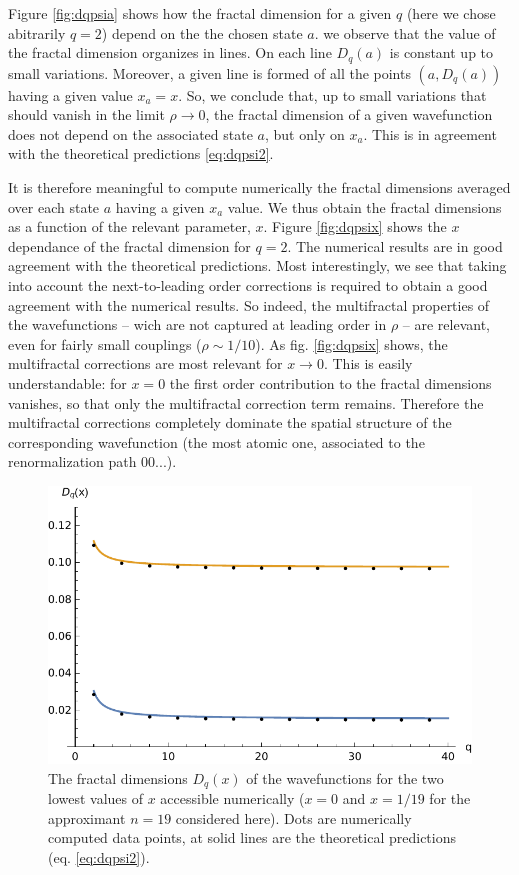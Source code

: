 \documentclass[aps,prl,preprint]{revtex4-1}
\begin{document}
Figure \eqref{fig:dqpsia} shows how the fractal dimension for a given $q$ (here we chose abitrarily $q=2$) depend on the the chosen state $a$.
we observe that the value of the fractal dimension organizes in lines. On each line $D_q(a)$ is constant up to small variations. Moreover, a given line is formed of all the points $(a, D_q(a))$ having a given value $x_a = x$. 
So, we conclude that, up to small variations that should vanish in the limit $\rho \rightarrow 0$, the fractal dimension of a given wavefunction does not depend on the associated state $a$, but only on $x_a$. This is in agreement with the theoretical predictions \eqref{eq:dqpsi2}.

It is therefore meaningful to compute numerically the fractal dimensions averaged over each state $a$ having a given $x_a$ value. We thus obtain the fractal dimensions as a function of the relevant parameter, $x$.
Figure \eqref{fig:dqpsix} shows the $x$ dependance of the fractal dimension for $q=2$. 
The numerical results are in good agreement with the theoretical predictions.
Most interestingly, we see that taking into account the next-to-leading order corrections is required to obtain a good agreement with the numerical results.
So indeed, the multifractal properties of the wavefunctions -- wich are not captured at leading order in $\rho$ -- are relevant, even for fairly small couplings ($\rho \sim 1/10$).
As fig. \eqref{fig:dqpsix} shows, the multifractal corrections are most relevant for $x \rightarrow 0$.
This is easily understandable: for $x=0$ the first order contribution to the fractal dimensions vanishes, so that only the multifractal correction term remains. 
Therefore the multifractal corrections completely dominate the spatial structure of the corresponding wavefunction (the most atomic one, associated to the renormalization path $00...$).

\begin{figure}[htp]
  \centering
  \includegraphics[width=.5\textwidth]{img/local_wf_q.pdf}
  \caption{The fractal dimensions $D_q(x)$ of the wavefunctions for the two lowest values of $x$ accessible numerically ($x = 0$ and $x = 1/19$ for the approximant $n=19$ considered here). Dots are numerically computed data points, at solid lines are the theoretical predictions (eq. \eqref{eq:dqpsi2}).}
\label{fig:dqpsiq}
\end{figure}
\end{document}
